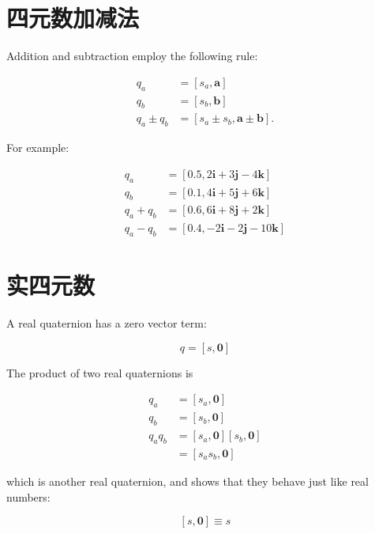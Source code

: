 \section{四元数加减法}
Addition and subtraction employ the following rule:

$$
    \begin{aligned}
        q_{a}           & =\left[s_{a}, \mathbf{a}\right]                            \\
        q_{b}           & =\left[s_{b}, \mathbf{b}\right]                            \\
        q_{a} \pm q_{b} & =\left[s_{a} \pm s_{b}, \mathbf{a} \pm \mathbf{b}\right] .
    \end{aligned}
$$

For example:

$$
    \begin{aligned}
        q_{a}       & =[0.5,2 \mathbf{i}+3 \mathbf{j}-4 \mathbf{k}]   \\
        q_{b}       & =[0.1,4 \mathbf{i}+5 \mathbf{j}+6 \mathbf{k}]   \\
        q_{a}+q_{b} & =[0.6,6 \mathbf{i}+8 \mathbf{j}+2 \mathbf{k}]   \\
        q_{a}-q_{b} & =[0.4,-2 \mathbf{i}-2 \mathbf{j}-10 \mathbf{k}]
    \end{aligned}
$$

\section{实四元数}
A real quaternion has a zero vector term:

$$
    q=[s, \mathbf{0}]
$$

The product of two real quaternions is

$$
    \begin{aligned}
        q_{a}       & =\left[s_{a}, \mathbf{0}\right]                               \\
        q_{b}       & =\left[s_{b}, \mathbf{0}\right]                               \\
        q_{a} q_{b} & =\left[s_{a}, \mathbf{0}\right]\left[s_{b}, \mathbf{0}\right] \\
                    & =\left[s_{a} s_{b}, \mathbf{0}\right]
    \end{aligned}
$$

which is another real quaternion, and shows that they behave just like real numbers:

$$
    [s, \mathbf{0}] \equiv s
$$

